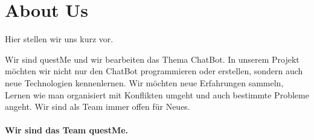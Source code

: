 \section{About Us}
Hier stellen wir uns kurz vor.
\\
\begin{center}
\end{center}
Wir sind questMe und wir bearbeiten das Thema ChatBot.
In unserem Projekt möchten wir nicht nur den ChatBot programmieren oder erstellen, sondern auch neue Technologien kennenlernen.
Wir möchten neue Erfahrungen sammeln, Lernen wie man organisiert mit Konflikten umgeht und auch bestimmte Probleme angeht.
Wir sind als Team immer offen für Neues.
\\
\\
\textbf{Wir sind das Team questMe.}
